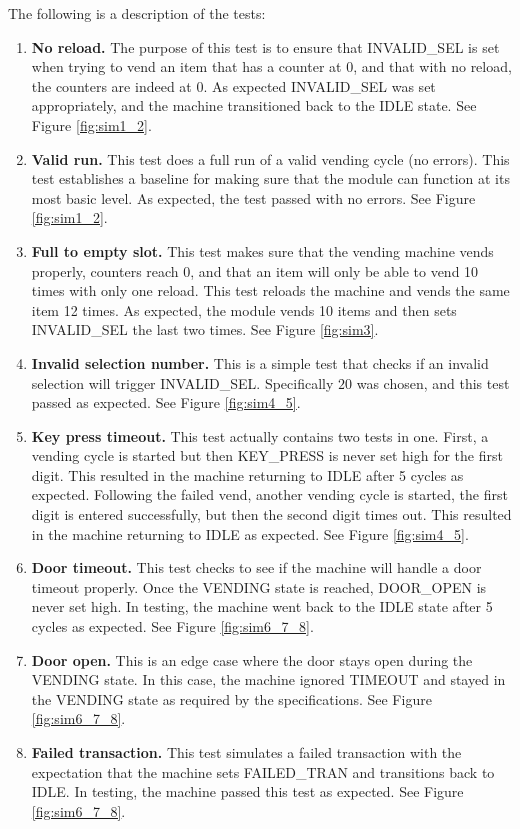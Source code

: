 \documentclass{article}
\begin{document}
The following is a description of the tests:
\begin{enumerate}
    \item \textbf{No reload.} The purpose of this test is to ensure that INVALID\_SEL is set when trying to vend an item that has a counter at 0, and that with no reload, the counters are indeed at 0. As expected INVALID\_SEL was set appropriately, and the machine transitioned back to the IDLE state. See Figure \ref{fig:sim1_2}.
    \item \textbf{Valid run.} This test does a full run of a valid vending cycle (no errors). This test establishes a baseline for making sure that the module can function at its most basic level. As expected, the test passed with no errors. See Figure \ref{fig:sim1_2}.
    \item \textbf{Full to empty slot.} This test makes sure that the vending machine vends properly, counters reach 0, and that an item will only be able to vend 10 times with only one reload. This test reloads the machine and vends the same item 12 times. As expected, the module vends 10 items and then sets INVALID\_SEL the last two times. See Figure \ref{fig:sim3}.
    \item \textbf{Invalid selection number.} This is a simple test that checks if an invalid selection will trigger INVALID\_SEL. Specifically $20$ was chosen, and this test passed as expected. See Figure \ref{fig:sim4_5}.
    \item \textbf{Key press timeout.} This test actually contains two tests in one. First, a vending cycle is started but then KEY\_PRESS is never set high for the first digit. This resulted in the machine returning to IDLE after 5 cycles as expected. Following the failed vend, another vending cycle is started, the first digit is entered successfully, but then the second digit times out. This resulted in the machine returning to IDLE as expected. See Figure \ref{fig:sim4_5}.
    \item \textbf{Door timeout.} This test checks to see if the machine will handle a door timeout properly. Once the VENDING state is reached, DOOR\_OPEN is never set high. In testing, the machine went back to the IDLE state after 5 cycles as expected. See Figure \ref{fig:sim6_7_8}.
    \item \textbf{Door open.} This is an edge case where the door stays open during the VENDING state. In this case, the machine ignored TIMEOUT and stayed in the VENDING state as required by the specifications. See Figure \ref{fig:sim6_7_8}.
    \item \textbf{Failed transaction.} This test simulates a failed transaction with the expectation that the machine sets FAILED\_TRAN and transitions back to IDLE. In testing, the machine passed this test as expected. See Figure \ref{fig:sim6_7_8}.
\end{enumerate}
\end{document}
